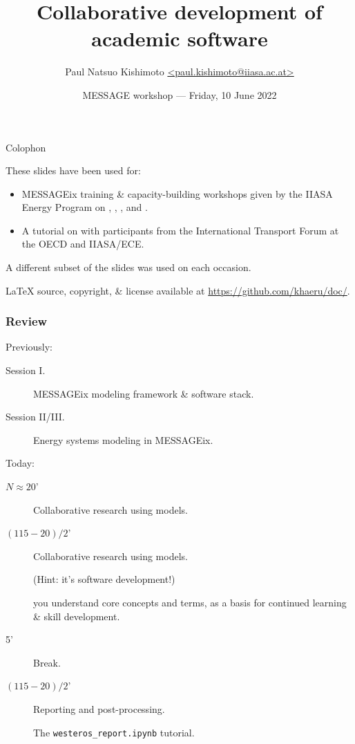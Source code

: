 \documentclass[12pt,aspectratio=169]{beamer}
\title{Collaborative development of academic software}
\institute{IIASA Energy, Climate, and Environment program}
\date{MESSAGE workshop — Friday, 10 June 2022}
\author{\texorpdfstring{Paul Natsuo Kishimoto \scriptsize\newline
  \href{mailto:paul.kishimoto@iiasa.ac.at}%
       {\ttfamily <paul.kishimoto@iiasa.ac.at>}}%
  {Paul Natsuo Kishimoto <paul.kishimoto@iiasa.ac.at>}}
\begin{document}
\maketitle

\begin{frame}{Colophon}

  These slides have been used for:
  \begin{itemize}
    \item MESSAGEix training \& capacity-building workshops given by the IIASA Energy Program on , , , and .

    \item A tutorial on  with participants from the International Transport Forum at the OECD and IIASA/ECE.
  \end{itemize}

  \medskip
  A different subset of the slides was used on each occasion.

  \medskip
  LaTeX source, copyright, \& license available at \url{https://github.com/khaeru/doc/}.

\end{frame}

\begin{frame}  %
  \frametitle{Review}

  Previously:
  \begin{description}
    \item [Session I.] MESSAGEix modeling framework \& software stack.
    \item [Session II/III.] Energy systems modeling in MESSAGEix.
  \end{description}

  \bigskip
  Today:
  \begin{description}
    \item [$N \approx 20$'] Collaborative research using models.


    \item [$(115 - 20) / 2$'] Collaborative research using models.

          (Hint: it's software development!)

           you understand core concepts and terms, as a basis for continued learning \& skill development.

    \item [5'] Break.

    \item [$(115 - 20) / 2$'] Reporting and post-processing.

          The \texttt{westeros\_report.ipynb} tutorial.
  \end{description}

\end{frame}
\end{document}

